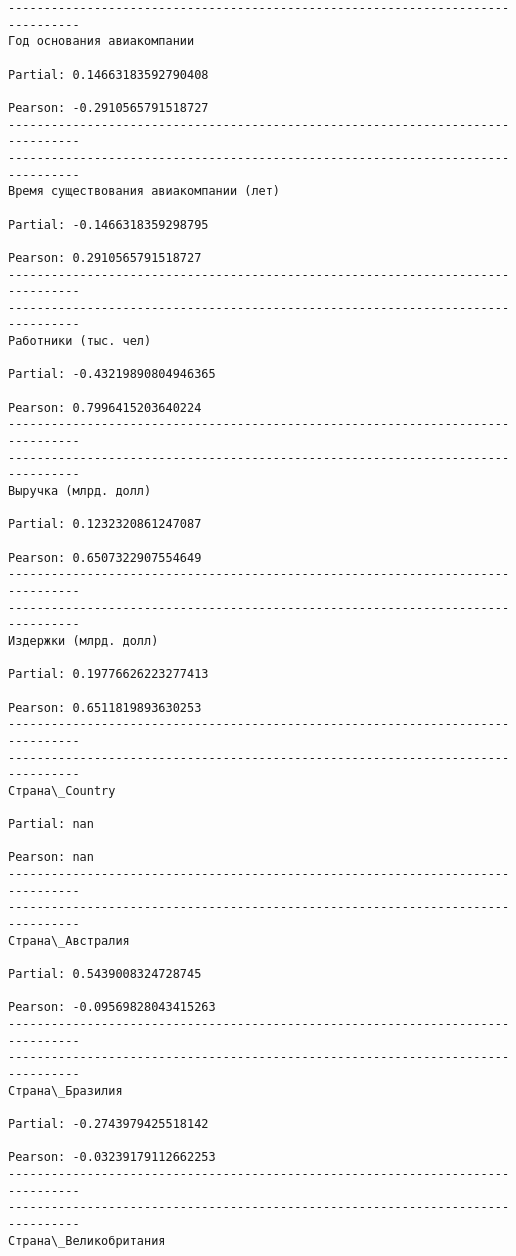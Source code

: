 \documentclass[11pt,mathletters]{article}
\begin{document}
    \begin{Verbatim}[commandchars=\\\{\}]
--------------------------------------------------------------------------------
Год основания авиакомпании

Partial: 0.14663183592790408

Pearson: -0.2910565791518727
--------------------------------------------------------------------------------
--------------------------------------------------------------------------------
Время существования авиакомпании (лет)

Partial: -0.1466318359298795

Pearson: 0.2910565791518727
--------------------------------------------------------------------------------
--------------------------------------------------------------------------------
Работники (тыс. чел)

Partial: -0.43219890804946365

Pearson: 0.7996415203640224
--------------------------------------------------------------------------------
--------------------------------------------------------------------------------
Выручка (млрд. долл)

Partial: 0.1232320861247087

Pearson: 0.6507322907554649
--------------------------------------------------------------------------------
--------------------------------------------------------------------------------
Издержки (млрд. долл)

Partial: 0.19776626223277413

Pearson: 0.6511819893630253
--------------------------------------------------------------------------------
--------------------------------------------------------------------------------
Страна\_Country

Partial: nan

Pearson: nan
--------------------------------------------------------------------------------
--------------------------------------------------------------------------------
Страна\_Австралия

Partial: 0.5439008324728745

Pearson: -0.09569828043415263
--------------------------------------------------------------------------------
--------------------------------------------------------------------------------
Страна\_Бразилия

Partial: -0.2743979425518142

Pearson: -0.03239179112662253
--------------------------------------------------------------------------------
--------------------------------------------------------------------------------
Страна\_Великобритания


\end{Verbatim}
\end{document}
